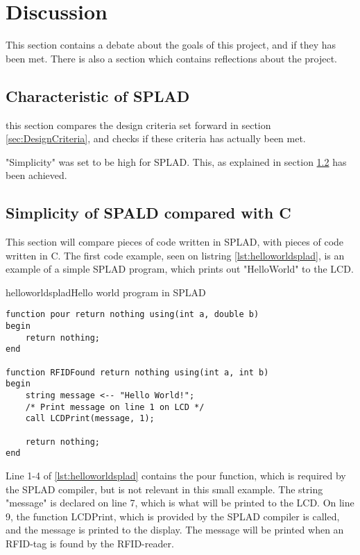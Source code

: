 \section{Discussion}
\label{sec:discussion}
This section contains a debate about the goals of this project, and if they has been met. There is also a section which contains reflections about the project.

\subsection{Characteristic of SPLAD}
this section compares the design criteria set forward in section \ref{sec:DesignCriteria}, and checks if these criteria has actually been met.

"Simplicity" was set to be high for SPLAD. This, as explained in section \ref{sec:simplespladc} has been achieved. 

\subsection{Simplicity of SPALD compared with C}
\label{sec:simplespladc}
This section will compare pieces of code written in SPLAD, with pieces of code written in C. The first code example, seen on listring \ref{lst:helloworldsplad}, is an example of a simple SPLAD program, which prints out "HelloWorld" to the LCD.

\begin{code}{helloworldsplad}{Hello world program in SPLAD}
\begin{lstlisting}
function pour return nothing using(int a, double b)
begin
	return nothing;
end

function RFIDFound return nothing using(int a, int b)
begin
	string message <-- "Hello World!";
	/* Print message on line 1 on LCD */
	call LCDPrint(message, 1);

	return nothing;
end
\end{lstlisting}
\end{code}

Line 1-4 of \ref{lst:helloworldsplad} contains the pour function, which is required by the SPLAD compiler, but is not relevant in this small example. The string "message" is declared on line 7, which is what will be printed to the LCD. On line 9, the function LCDPrint, which is provided by the SPLAD compiler is called, and the message is printed to the display. The message will be printed when an RFID-tag is found by the RFID-reader.

